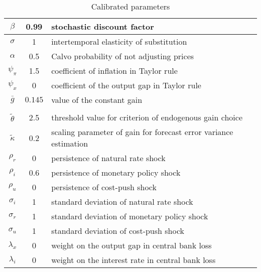 \documentclass[11pt]{article}
\renewcommand{\[}{\begin{equation}}
\renewcommand{\]}{\end{equation}}
\begin{document}
\begin{center}
\begin{table}
\begin{tabular}{ c | c  | l }
 $\beta$ & 0.99 & stochastic discount factor \\  \hline
 $\sigma$ & 1  & intertemporal elasticity of substitution \\  \hline
 $\alpha$ & 0.5 &  Calvo probability of not adjusting prices \\\hline
 $\psi_{\pi} $& 1.5  & coefficient of inflation in Taylor rule \\\hline
 $\psi_x$ & 0   & coefficient of the output gap in Taylor rule  \\\hline
 $\bar{g}$ & $0.145$  & value of the constant gain \\\hline
& & \\ [-1em] %
 $\tilde{\theta}$ &  2.5  & threshold value for criterion of endogenous gain choice \\ \hline
  $\tilde{\kappa}$ &  0.2  & scaling parameter of gain for forecast error variance estimation \\ \hline
    $\rho_r$ & 0 &   persistence of natural rate shock \\ \hline
    $\rho_i$ & 0.6 &  persistence of monetary policy shock  \\ \hline
    $\rho_u$ & 0  &  persistence of cost-push shock  \\ \hline
    $\sigma_i$ & 1 & standard deviation of natural rate shock  \\ \hline
    $\sigma_r$ &  1  &standard deviation of monetary policy shock  \\ \hline
    $\sigma_u$ & 1 & standard deviation of cost-push shock   \\ \hline  
    $\lambda_x$ & 0 & weight on the output gap in central bank loss   \\ \hline  
    $\lambda_i$ & 0 & weight on the interest rate in central bank loss   \\ \hline  
\end{tabular}     
      \caption{Calibrated parameters}  \label{calibration}
 \end{table}
\end{center}

\vspace{-1.4cm}
\end{document}
